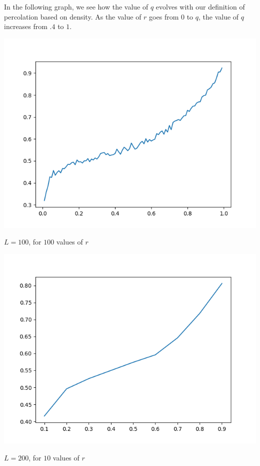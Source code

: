 \documentclass[article, 11pt, a4paper, onesize]{memoir}
\begin{document}
In the following graph, we see how the value of \(q\) evolves with our definition of
percolation based on density. As the value of \(r\) goes from \(0\) to \(q\), the value of
\(q\) increases from \(.4\) to \(1\).

\begin{minipage}{.5\linewidth}
    \includegraphics[width=.9\linewidth]{ratio_vs_qqq.png}

    \begin{center}
        \(L=100\), for \(100\) values of \(r\)
    \end{center}
\end{minipage}\hfill%
\begin{minipage}{.5\linewidth}
    \includegraphics[width=.9\linewidth]{ratio_vs_qq.png}

    \begin{center}
        \(L=200\), for \(10\) values of \(r\)
    \end{center}
\end{minipage}
\end{document}
